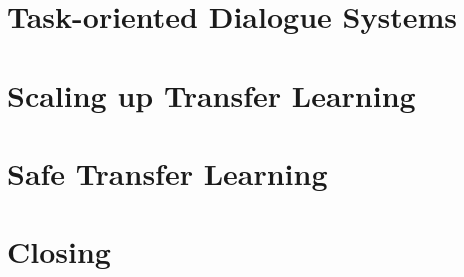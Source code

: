 \documentclass[12pt,fleqn]{book} %
\begin{document}
    

    

    \part{Task-oriented Dialogue Systems}
    \label{part:task-oriented-dialogue-systems}
    
    
    

    \part{Scaling up Transfer Learning}
    \label{part:contributions-scaling}
    

    \part{Safe Transfer Learning}
    \label{part:contributions-safe}
    
    

    \part{Closing}
    \label{part:closing}
    
    
    


    
\end{document}

